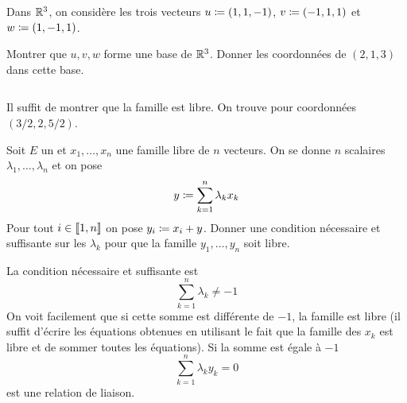 \documentclass{magnolia}
\begin{document}


Dans $\mathbb{R}^3$, on considère les trois vecteurs $u\coloneqq(1,1,-1)$, $v\coloneqq(-1,1,1)$ et
$w\coloneqq(1,-1,1)$.
\begin{questions}
\question Montrer que $u,v,w$ forme une base de $\mathbb{R}^3$.
\question Donner les coordonnées de $(2,1,3)$ dans cette base.
\end{questions}
\begin{sol}
$\quad$
\begin{questions}
\question Il suffit de montrer que la famille est libre.
\question On trouve pour coordonnées $(3/2,2,5/2)$.
\end{questions}
\end{sol}

Soit $E$ un \Kev et $x_1,\ldots,x_n$ une famille libre de $n$ vecteurs. On se
donne $n$ scalaires $\lambda_1,\ldots,\lambda_n$ et on pose
\[y\coloneqq\sum_{k=1}^n \lambda_k x_k\]
Pour tout $i\in\left\llbracket 1,n\right\rrbracket$ on pose $y_i\coloneqq x_i+y$. Donner une condition nécessaire
et suffisante sur les $\lambda_k$ pour que la famille $y_1,\ldots,y_n$ soit libre.
\begin{sol}
La condition nécessaire et suffisante est
\[\sum_{k=1}^n \lambda_k\neq -1\]
On voit facilement que si cette somme est différente de $-1$, la famille est
libre (il suffit d'écrire les équations obtenues en utilisant le fait que la
famille des $x_k$ est libre et de sommer toutes les équations). Si la somme
est égale à $-1$
\[\sum_{k=1}^n \lambda_k y_k=0\]
est une relation de liaison.
\end{sol}


\end{document}
